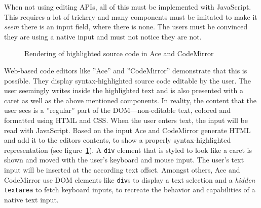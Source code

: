 When not using editing APIs, all of this must be implemented with JavaScript. This requires a lot of trickery and many components must be imitated to make it \textit{seem} there is an input field, where there is none. The users must be convinced they are using a native input and must not notice they are not.

\begin{figure}[!htb]
\centering
{}
\caption{Rendering of highlighted source code in Ace and CodeMirror}
\label{fig:ace_rendering_uml}
\end{figure}


Web-based code editors like ''Ace'' and ''CodeMirror'' demonstrate that this is possible. They display syntax-highlighted source code editable by the user. The user seemingly writes inside the highlighted text and is also presented with a caret as well as the above mentioned components. In reality, the content that the user sees is a ''regular'' part of the DOM---non-editable text, colored and formatted using HTML and CSS. When the user enters text, the input will be read with JavaScript. Based on the input Ace and CodeMirror generate HTML and add it to the editors contents, to show a properly syntax-highlighted representation (see figure~\ref{fig:ace_rendering_uml}). A \texttt{div} element that is styled to look like a caret is shown and moved with the user's keyboard and mouse input. The user's text input will be inserted at the according text offset. Amongst others, Ace and CodeMirror use DOM elements like \texttt{div}s to display a text selection and a \textit{hidden} \texttt{textarea} to fetch keyboard inputs, to recreate the behavior and capabilities of a native text input. %




